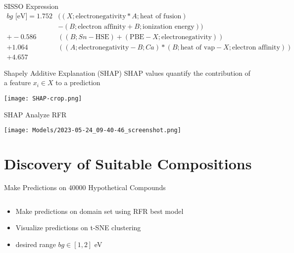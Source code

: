 \documentclass[10pt, aspectratio=169, presentation]{beamer}
\begin{document}
\begin{frame}[label={sec:orgefc13f8}]{SISSO Expression}
\begin{align*}
bg\mbox{ [eV]} = 1.752 &((X;\mbox{electronegativity}*A;\mbox{heat of fusion})\\
                       &-(B;\mbox{electron affinity}+B;\mbox{ionization energy}))\\
               +-0.586 &((B;Sn-\mbox{HSE})+(\mbox{PBE}-X;\mbox{electronegativity}))\\
                +1.064 &((A;\mbox{electronegativity}-B;Ca)*(B;\mbox{heat of vap}-X;\mbox{electron affinity}))\\
                +4.657
\end{align*}
\end{frame}

\begin{frame}[label={sec:org72e6309}]{Shapely Additive Explanation (SHAP)}
SHAP values quantify the contribution of a feature \(x_i \in X\) to a prediction
\autocite{lundberg-2017-unified-approac}

\begin{center}
\texttt{[image: SHAP-crop.png]}
\end{center}
\end{frame}

\begin{frame}[label={sec:orgd8966a7}]{SHAP Analyze RFR}
\begin{center}
\texttt{[image: Models/2023-05-24\_09-40-46\_screenshot.png]}
\end{center}
\end{frame}

\section{Discovery of Suitable Compositions}
\label{sec:orgf679947}
\begin{frame}[label={sec:org5da78f8}]{Make Predictions on \alert{40000} Hypothetical Compounds}
\begin{columns}
\begin{column}{0.4\columnwidth}
\begin{itemize}
\item Make predictions on domain set using RFR best model
\item Visualize predictions on t-SNE clustering
\item desired range \(bg \in [1, 2]\) eV
\end{itemize}
\end{column}

\begin{column}{0.6\columnwidth}
 
\begin{center}

\end{center}
\end{column}
\end{columns}
\end{frame}
\end{document}
